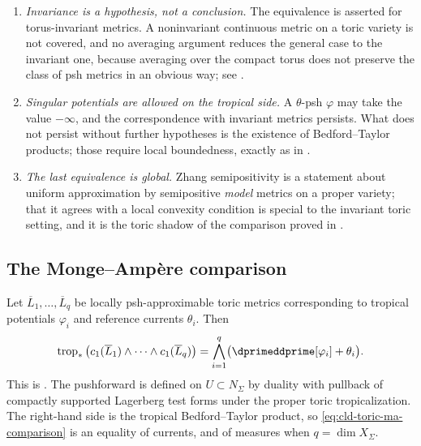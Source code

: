 \begin{enumerate}
\item\label{itm:ch19-toric-inv} \emph{Invariance is a hypothesis, not a
conclusion.}  The equivalence is asserted for torus-invariant metrics.  A
noninvariant continuous metric on a toric variety is not covered, and no
averaging argument reduces the general case to the invariant one, because
averaging over the compact torus does not preserve the class of psh metrics
in an obvious way; see .
\item\label{itm:ch19-toric-sing} \emph{Singular potentials are allowed on
the tropical side.}  A $\theta$-psh $\varphi$ may take the value
$-\infty$, and the correspondence with invariant metrics persists.  What
does not persist without further hypotheses is the existence of
Bedford--Taylor products; those require local boundedness, exactly as in
.
\item\label{itm:ch19-toric-global} \emph{The last equivalence is global.}
Zhang semipositivity is a statement about uniform approximation by
semipositive \emph{model} metrics on a proper variety; that it agrees with a
local convexity condition is special to the invariant toric setting, and it
is the toric shadow of the comparison proved in
.
\end{enumerate}

\subsection{The Monge--Amp\`ere comparison}
\label{sec:ch19-toric-ma}

Let $\overline L_1,\ldots,\overline L_q$ be locally psh-approximable toric
metrics corresponding to tropical potentials $\varphi_i$ and reference
currents $\theta_i$.  Then
\begin{equation}
 \operatorname{trop}_*\left(
      c_1(\overline L_1)\wedge\cdots\wedge c_1(\overline L_q)
                         \right)
       =\bigwedge_{i=1}^q\bigl(\dprimeddprime[\varphi_i]+\theta_i\bigr).
\label{eq:cld-toric-ma-comparison}
\end{equation}
This is \cite[Theorem~6.1.1]{BGJKK25}.  The pushforward is defined on
$U\subset N_\Sigma$ by duality with pullback of compactly supported
Lagerberg test forms under the proper toric tropicalization.  The
right-hand side is the tropical
Bedford--Taylor product, so \eqref{eq:cld-toric-ma-comparison} is an equality of
currents, and of measures when $q=\dim X_\Sigma$.

